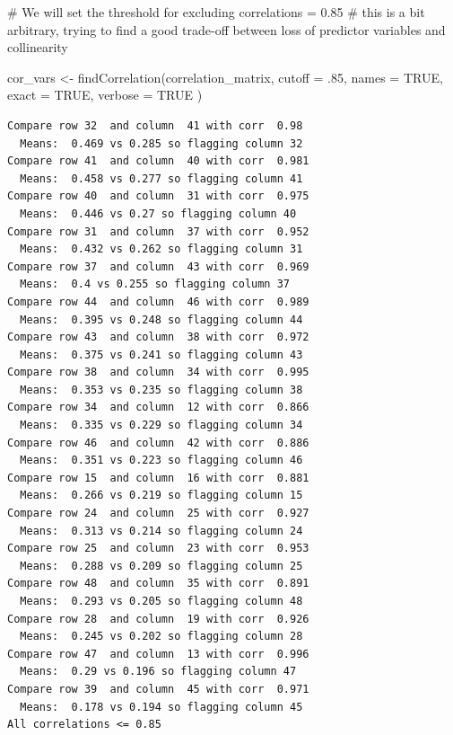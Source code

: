 \documentclass[
  letterpaper,
  DIV=11,
  numbers=noendperiod]{scrartcl}
\newenvironment{Shaded}{\begin{snugshade}}{\end{snugshade}}
\newcommand{\AttributeTok}[1]{\textcolor[rgb]{0.40,0.45,0.13}{#1}}
\newcommand{\CommentTok}[1]{\textcolor[rgb]{0.37,0.37,0.37}{#1}}
\newcommand{\ConstantTok}[1]{\textcolor[rgb]{0.56,0.35,0.01}{#1}}
\newcommand{\DecValTok}[1]{\textcolor[rgb]{0.68,0.00,0.00}{#1}}
\newcommand{\FunctionTok}[1]{\textcolor[rgb]{0.28,0.35,0.67}{#1}}
\newcommand{\NormalTok}[1]{\textcolor[rgb]{0.00,0.23,0.31}{#1}}
\newcommand{\OtherTok}[1]{\textcolor[rgb]{0.00,0.23,0.31}{#1}}
\begin{document}
\begin{Shaded}
\begin{Highlighting}[]
\CommentTok{\# We will set the threshold for excluding correlations = 0.85}
\CommentTok{\# this is a bit arbitrary, trying to find a good trade{-}off between loss of predictor variables and collinearity}

\NormalTok{cor\_vars }\OtherTok{\textless{}{-}} \FunctionTok{findCorrelation}\NormalTok{(correlation\_matrix,}
    \AttributeTok{cutoff =}\NormalTok{ .}\DecValTok{85}\NormalTok{,}
    \AttributeTok{names =} \ConstantTok{TRUE}\NormalTok{,}
    \AttributeTok{exact =} \ConstantTok{TRUE}\NormalTok{,}
    \AttributeTok{verbose =} \ConstantTok{TRUE}
\NormalTok{)}
\end{Highlighting}
\end{Shaded}

\begin{verbatim}
Compare row 32  and column  41 with corr  0.98 
  Means:  0.469 vs 0.285 so flagging column 32 
Compare row 41  and column  40 with corr  0.981 
  Means:  0.458 vs 0.277 so flagging column 41 
Compare row 40  and column  31 with corr  0.975 
  Means:  0.446 vs 0.27 so flagging column 40 
Compare row 31  and column  37 with corr  0.952 
  Means:  0.432 vs 0.262 so flagging column 31 
Compare row 37  and column  43 with corr  0.969 
  Means:  0.4 vs 0.255 so flagging column 37 
Compare row 44  and column  46 with corr  0.989 
  Means:  0.395 vs 0.248 so flagging column 44 
Compare row 43  and column  38 with corr  0.972 
  Means:  0.375 vs 0.241 so flagging column 43 
Compare row 38  and column  34 with corr  0.995 
  Means:  0.353 vs 0.235 so flagging column 38 
Compare row 34  and column  12 with corr  0.866 
  Means:  0.335 vs 0.229 so flagging column 34 
Compare row 46  and column  42 with corr  0.886 
  Means:  0.351 vs 0.223 so flagging column 46 
Compare row 15  and column  16 with corr  0.881 
  Means:  0.266 vs 0.219 so flagging column 15 
Compare row 24  and column  25 with corr  0.927 
  Means:  0.313 vs 0.214 so flagging column 24 
Compare row 25  and column  23 with corr  0.953 
  Means:  0.288 vs 0.209 so flagging column 25 
Compare row 48  and column  35 with corr  0.891 
  Means:  0.293 vs 0.205 so flagging column 48 
Compare row 28  and column  19 with corr  0.926 
  Means:  0.245 vs 0.202 so flagging column 28 
Compare row 47  and column  13 with corr  0.996 
  Means:  0.29 vs 0.196 so flagging column 47 
Compare row 39  and column  45 with corr  0.971 
  Means:  0.178 vs 0.194 so flagging column 45 
All correlations <= 0.85 
\end{verbatim}
\end{document}
